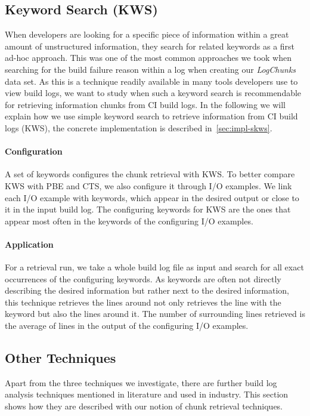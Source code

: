 \documentclass[\myrootdir/main.tex]{subfiles}
\begin{document}
\subsection{Keyword Search (KWS)}
\label{sec:expl-skws}
When developers are looking for a specific piece of information within a great amount of unstructured information, they search for related keywords as a first ad-hoc approach.
This was one of the most common approaches we took when searching for the build failure reason within a log when creating our \emph{LogChunks} data set.
As this is a technique readily available in many tools developers use to view build logs, we want to study when such a keyword search is recommendable for retrieving information chunks from CI build logs.
In the following we will explain how we use simple keyword search to retrieve information from CI build logs (KWS), the concrete implementation is described in~\ref{sec:impl-skws}.

\paragraph{Configuration}
A set of keywords configures the chunk retrieval with KWS\@.
To better compare KWS with PBE and CTS, we also configure it through I/O examples.
We link each I/O example with keywords, which appear in the desired output or close to it in the input build log.
The configuring keywords for KWS are the ones that appear most often in the keywords of the configuring I/O examples.

\paragraph{Application}
For a retrieval run, we take a whole build log file as input and search for all exact occurrences of the configuring keywords.
As keywords are often not directly describing the desired information but rather next to the desired information, this technique retrieves the lines around not only retrieves the line with the keyword but also the lines around it.
The number of surrounding lines retrieved is the average of lines in the output of the configuring I/O examples.

\subsection{Other Techniques}
\label{sec:expl-rlr}
Apart from the three techniques we investigate, there are further build log analysis techniques mentioned in literature and used in industry.
This section shows how they are described with our notion of chunk retrieval techniques.
\end{document}
